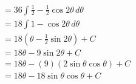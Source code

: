 \documentclass[preview]{standalone}
\begin{document}
\begin{align*}
&=36 \int \frac{1}{2} - \frac{1}{2}\cos2\theta \, d\theta \\ &=18 \int 1-\cos2\theta \, d\theta \\ &=18(\theta-\frac{1}{2}\sin2\theta) + C \\ &=18\theta-9\sin2\theta +C \\ &=18\theta-(9)(2\sin\theta\cos\theta) + C \\ &=18\theta-18\sin\theta\cos\theta +C
\end{align*}
\end{document}
